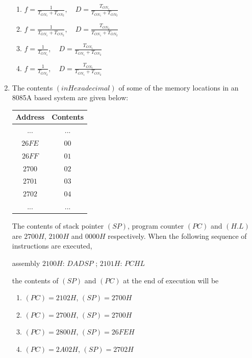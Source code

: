 \documentclass{article}
\newcommand{\brak}[1]{\left( #1 \right)}
\begin{document}
\begin{enumerate}
    \begin{enumerate}
            \item $f = \frac{1}{T_{ON_1} + T_{ON_2}}, \quad D = \frac{T_{ON_1}}{T_{ON_1} + T_{ON_2}}$
            \item $f = \frac{1}{T_{ON_1} + T_{ON_2}}, \quad D = \frac{T_{ON_2}}{T_{ON_1} + T_{ON_2}}$
            \item $f = \frac{1}{T_{ON_1}}, \quad D = \frac{T_{ON_1}}{T_{ON_1} + T_{ON_2}}$
            \item $f = \frac{1}{T_{ON_2}}, \quad D = \frac{T_{ON_1}}{T_{ON_1} + T_{ON_2}}$
        \end{enumerate}

    \item The contents $\brak{in Hexadecimal}$ of some of the memory locations in an 8085A based system are given below:

    \begin{tabular}{|c|c|}
        \hline
        Address & Contents \\
        \hline
        ... & ... \\
        $26FE$ & $00$ \\
        $26FF$ & $01$ \\
        $2700$ & $02$ \\
        $2701$ & $03$ \\
        $2702$ & $04$ \\
        ... & ... \\
        \hline
    \end{tabular}

    The contents of stack pointer $\brak{SP}$, program counter $\brak{PC}$ and $\brak{H.L}$ are $2700H$, $2100H$ and $0000H$ respectively. When the following sequence of instructions  
 are executed,

    assembly
    $2100 H$:  $DAD SP$ ;
    $2101 H$:  $PCHL$
    

    the contents of $\brak{SP}$ and $\brak{PC}$ at the end of execution will be
        \begin{enumerate}
            \item $\brak{PC} = 2102H$, $\brak{SP} = 2700H$
            \item $\brak{PC} = 2700H$, $\brak{SP} = 2700H$
            \item $\brak{PC} = 2800H$, $\brak{SP} = 26FEH$
            \item $\brak{PC} = 2A02H$, $\brak{SP} = 2702H$
        \end{enumerate}


\end{enumerate}
\end{document}
